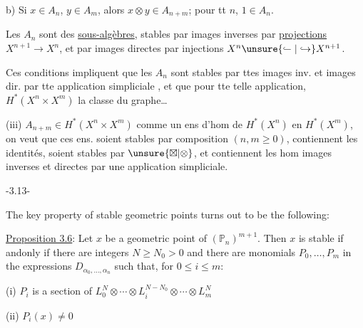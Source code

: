 b) Si $x\in A_n$, $y\in A_m$, alors $x\otimes y\in A_{n+m}$; pour tt $n$, $1\in A_n$.


 Les  $A_n$ sont des \uline{sous-algèbres}, stables par images inverses  par \uline{projections} $X^{n+1}\longrightarrow X^n$, et  par images directes par injections $X^n\unsure{\lhook\joinrel\relbar|\hookrightarrow}X^{n+1}$.


Ces conditions impliquent que les $A_n$ sont stables par ttes images inv. et images dir. par tte application simpliciale , et que  pour tte telle application, $H^*(X^n\times X^m)$  la classe du graphe\ldots

(iii)  $A_{n+m}\in H^*(X^n\times X^m)$ comme un ens d'hom de $H^*(X^n)$ en $H^*(X^m)$, on veut que ces ens. soient stables par composition $(n,m\geq0)$, contiennent les identités, soient stables par $\unsure{\boxtimes|\otimes}$, et contiennent les hom images inverses et directes par une application simpliciale.
\begin{center}-3.13-\end{center}
The key property of stable geometric points turns out to be the following:

\uline{Proposition 3.6}: Let $x$ be a geometric point of $(\mathbb{P}_n)^{m+1}$. Then $x$ is stable if andonly if there are integers $N\geq N_0>0$ and there are monomials $P_0,\ldots,P_m$ in the expressions $D_{\alpha_0,\ldots,\alpha_n}$ such that, for $0\leq i\leq m$:

(i) $P_i$ is a section of $L_0^N\otimes\cdots\otimes L_i^{N-N_0}\otimes\cdots\otimes L_m^N$

(ii) $P_i(x)\ne0$

